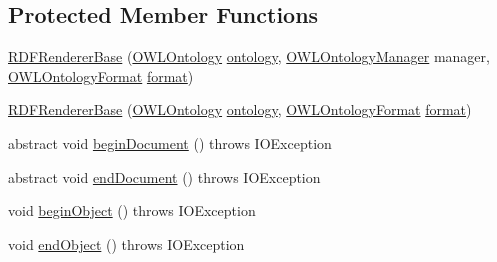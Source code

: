 \subsection*{Protected Member Functions}
\begin{DoxyCompactItemize}
\item 
\hyperlink{classorg_1_1coode_1_1owlapi_1_1rdf_1_1renderer_1_1_r_d_f_renderer_base_a7b2efd944428e8ff22b7f9ac28cbc6de}{R\-D\-F\-Renderer\-Base} (\hyperlink{interfaceorg_1_1semanticweb_1_1owlapi_1_1model_1_1_o_w_l_ontology}{O\-W\-L\-Ontology} \hyperlink{classorg_1_1coode_1_1owlapi_1_1rdf_1_1renderer_1_1_r_d_f_renderer_base_a1c2e169e03ca2cdf866ca19387b258e4}{ontology}, \hyperlink{interfaceorg_1_1semanticweb_1_1owlapi_1_1model_1_1_o_w_l_ontology_manager}{O\-W\-L\-Ontology\-Manager} manager, \hyperlink{classorg_1_1semanticweb_1_1owlapi_1_1model_1_1_o_w_l_ontology_format}{O\-W\-L\-Ontology\-Format} \hyperlink{classorg_1_1coode_1_1owlapi_1_1rdf_1_1renderer_1_1_r_d_f_renderer_base_ac803b83f4983e68929a507094c7a7c38}{format})
\item 
\hyperlink{classorg_1_1coode_1_1owlapi_1_1rdf_1_1renderer_1_1_r_d_f_renderer_base_aae56b24dbae2b62b79696f1a90f0b101}{R\-D\-F\-Renderer\-Base} (\hyperlink{interfaceorg_1_1semanticweb_1_1owlapi_1_1model_1_1_o_w_l_ontology}{O\-W\-L\-Ontology} \hyperlink{classorg_1_1coode_1_1owlapi_1_1rdf_1_1renderer_1_1_r_d_f_renderer_base_a1c2e169e03ca2cdf866ca19387b258e4}{ontology}, \hyperlink{classorg_1_1semanticweb_1_1owlapi_1_1model_1_1_o_w_l_ontology_format}{O\-W\-L\-Ontology\-Format} \hyperlink{classorg_1_1coode_1_1owlapi_1_1rdf_1_1renderer_1_1_r_d_f_renderer_base_ac803b83f4983e68929a507094c7a7c38}{format})
\item 
abstract void \hyperlink{classorg_1_1coode_1_1owlapi_1_1rdf_1_1renderer_1_1_r_d_f_renderer_base_ad52b216d5b96e4ae35ca8e47beb3f44f}{begin\-Document} ()  throws I\-O\-Exception
\item 
abstract void \hyperlink{classorg_1_1coode_1_1owlapi_1_1rdf_1_1renderer_1_1_r_d_f_renderer_base_aec7320e43a1060fb3a8d91aed1d65d2a}{end\-Document} ()  throws I\-O\-Exception
\item 
void \hyperlink{classorg_1_1coode_1_1owlapi_1_1rdf_1_1renderer_1_1_r_d_f_renderer_base_afc5acc1302b10c8cc439ccfece7d87ef}{begin\-Object} ()  throws I\-O\-Exception 
\item 
void \hyperlink{classorg_1_1coode_1_1owlapi_1_1rdf_1_1renderer_1_1_r_d_f_renderer_base_a7a5613ece73cefad1b74756047fb31bc}{end\-Object} ()  throws I\-O\-Exception 
\item 

\end{DoxyCompactItemize}
